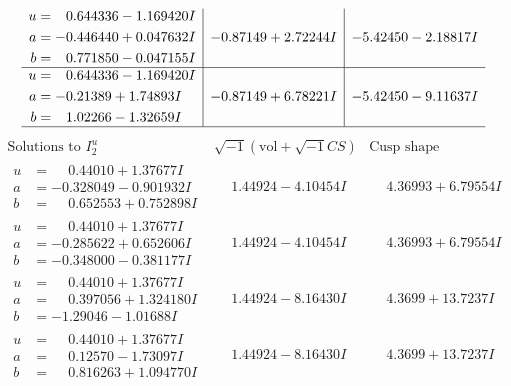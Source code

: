 \documentclass[1p]{elsarticle_modified}
\theoremstyle{definition}
\newcommand{\I}{\sqrt{-1}}
\begin{document}
$$\begin{array}{c|c|c}
\begin{aligned}
u &= \phantom{-}0.644336 - 1.169420 I \\
a &= -0.446440 + 0.047632 I \\
b &= \phantom{-}0.771850 - 0.047155 I\end{aligned}
 & -0.87149 + 2.72244 I & -5.42450 - 2.18817 I \\ \hline\begin{aligned}
u &= \phantom{-}0.644336 - 1.169420 I \\
a &= -0.21389 + 1.74893 I \\
b &= \phantom{-}1.02266 - 1.32659 I\end{aligned}
 & -0.87149 + 6.78221 I & -5.42450 - 9.11637 I\\
 \hline 
 \end{array}$$\newpage$$\begin{array}{c|c|c}  
\text{Solutions to }I^u_{2}& \I (\text{vol} + \sqrt{-1}CS) & \text{Cusp shape}\\
 \hline 
\begin{aligned}
u &= \phantom{-}0.44010 + 1.37677 I \\
a &= -0.328049 - 0.901932 I \\
b &= \phantom{-}0.652553 + 0.752898 I\end{aligned}
 & \phantom{-}1.44924 - 4.10454 I & \phantom{-}4.36993 + 6.79554 I \\ \hline\begin{aligned}
u &= \phantom{-}0.44010 + 1.37677 I \\
a &= -0.285622 + 0.652606 I \\
b &= -0.348000 - 0.381177 I\end{aligned}
 & \phantom{-}1.44924 - 4.10454 I & \phantom{-}4.36993 + 6.79554 I \\ \hline\begin{aligned}
u &= \phantom{-}0.44010 + 1.37677 I \\
a &= \phantom{-}0.397056 + 1.324180 I \\
b &= -1.29046 - 1.01688 I\end{aligned}
 & \phantom{-}1.44924 - 8.16430 I & \phantom{-}4.3699 + 13.7237 I \\ \hline\begin{aligned}
u &= \phantom{-}0.44010 + 1.37677 I \\
a &= \phantom{-}0.12570 - 1.73097 I \\
b &= \phantom{-}0.816263 + 1.094770 I\end{aligned}
 & \phantom{-}1.44924 - 8.16430 I & \phantom{-}4.3699 + 13.7237 I \\ \hline\begin{aligned}

\end{aligned}
\end{array}$$
\end{document}
